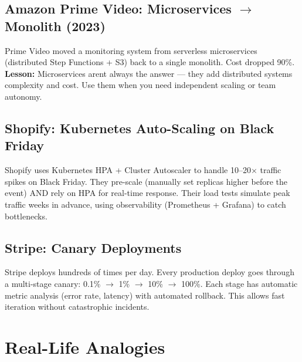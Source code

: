 \documentclass[11pt]{article}
\begin{document}
\subsection{\texorpdfstring{Amazon Prime Video: Microservices \(\rightarrow\) Monolith (2023)}{Amazon Prime Video: Microservices \textbackslash rightarrow Monolith (2023)}}\label{amazon-prime-video-microservices-rightarrow-monolith-2023}

Prime Video moved a monitoring system from serverless microservices (distributed Step Functions + S3) back to a single monolith. Cost dropped 90\%. \textbf{Lesson:} Microservices aren\textquotesingle t always the answer --- they add distributed systems complexity and cost. Use them when you need independent scaling or team autonomy.

\subsection{Shopify: Kubernetes Auto-Scaling on Black Friday}\label{shopify-kubernetes-auto-scaling-on-black-friday}


Shopify uses Kubernetes HPA + Cluster Autoscaler to handle 10--20\(\times\) traffic spikes on Black Friday. They pre-scale (manually set replicas higher before the event) AND rely on HPA for real-time response. Their load tests simulate peak traffic weeks in advance, using observability (Prometheus + Grafana) to catch bottlenecks.

\subsection{Stripe: Canary Deployments}\label{stripe-canary-deployments}

Stripe deploys hundreds of times per day. Every production deploy goes through a multi-stage canary: 0.1\% \(\rightarrow\) 1\% \(\rightarrow\) 10\% \(\rightarrow\) 100\%. Each stage has automatic metric analysis (error rate, latency) with automated rollback. This allows fast iteration without catastrophic incidents.

\section{Real-Life Analogies}\label{real-life-analogies}
\end{document}
